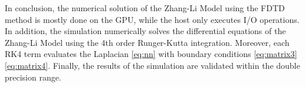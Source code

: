 \vspace{4.0em}

In conclusion, the numerical solution of the Zhang-Li Model using the FDTD method is mostly done on the GPU, while the host only executes I/O operations. In addition, the simulation numerically solves the differential equations of the Zhang-Li Model using the 4th order Runger-Kutta integration. Moreover, each RK4 term evaluates the Laplacian \ref{eq:nn} with boundary conditions \ref{eq:matrix3} \ref{eq:matrix4}. Finally, the results of the simulation are validated within the double precision range.



